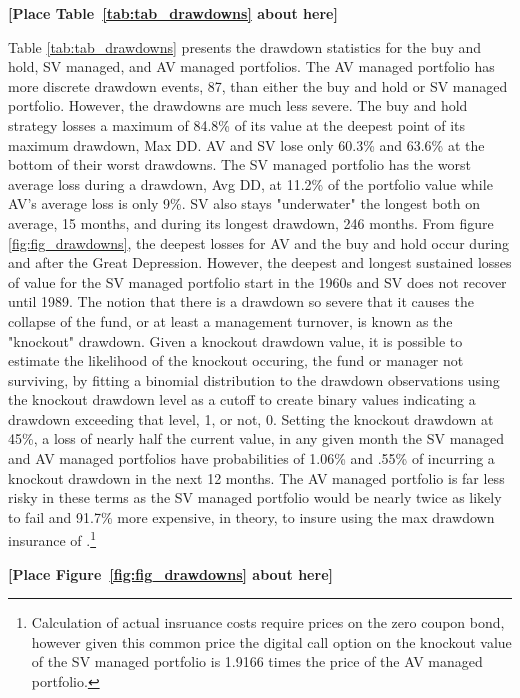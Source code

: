 \bigskip
\centerline{\bf [Place Table~\ref{tab:tab_drawdowns} about here]}
\bigskip

Table \ref{tab:tab_drawdowns} presents the drawdown statistics for the buy and hold, SV managed, and AV managed portfolios. The AV managed portfolio has more discrete drawdown events, 87, than either the buy and hold or SV managed portfolio. However, the drawdowns are much less severe. The buy and hold strategy losses a maximum of 84.8\% of its value at the deepest point of its maximum drawdown, Max DD. AV and SV lose only 60.3\% and 63.6\% at the bottom of their worst drawdowns. The SV managed portfolio has the worst average loss during a drawdown, Avg DD, at 11.2\% of the portfolio value while AV's average loss is only 9\%. SV also stays "underwater" the longest both on average, 15 months, and during its longest drawdown, 246 months. From figure \ref{fig:fig_drawdowns}, the deepest losses for AV and the buy and hold occur during and after the Great Depression. However, the deepest and longest sustained losses of value for the SV managed portfolio start in the 1960s and SV does not recover until 1989. The notion that there is a drawdown so severe that it causes the collapse of the fund, or at least a management turnover, is known as the "knockout" drawdown. \citep{pav_notes_nodate} Given a knockout drawdown value, it is possible to estimate the likelihood of the knockout occuring, the fund or manager not surviving, by fitting a binomial distribution to the drawdown observations using the knockout drawdown level as a cutoff to create binary values indicating a drawdown exceeding that level, 1, or not, 0. \citep{pav_notes_nodate} Setting the knockout drawdown at 45\%, a loss of nearly half the current value, in any given month the SV managed and AV managed portfolios have probabilities of 1.06\% and .55\% of incurring a knockout drawdown in the next 12 months. The AV managed portfolio is far less risky in these terms as the SV managed portfolio would be nearly twice as likely to fail and 91.7\% more expensive, in theory, to insure using the max drawdown insurance of \citet{carr_maximum_2011}.\footnote{Calculation of actual insruance costs require prices on the zero coupon bond, however given this common price the digital call option on the knockout value of the SV managed portfolio is 1.9166 times the price of the AV managed portfolio.}

\bigskip
\centerline{\bf [Place Figure~\ref{fig:fig_drawdowns} about here]}
\bigskip